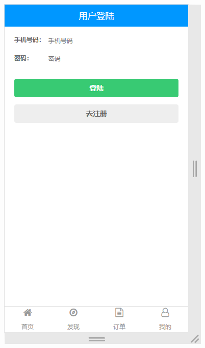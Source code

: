 \begin{figure}[H]
{\begin{minipage}[t]{0.22\linewidth}
            \includegraphics[scale=0.3]{figures/2.2.6.png}\\
        \end{minipage}
    }
\end{figure}
